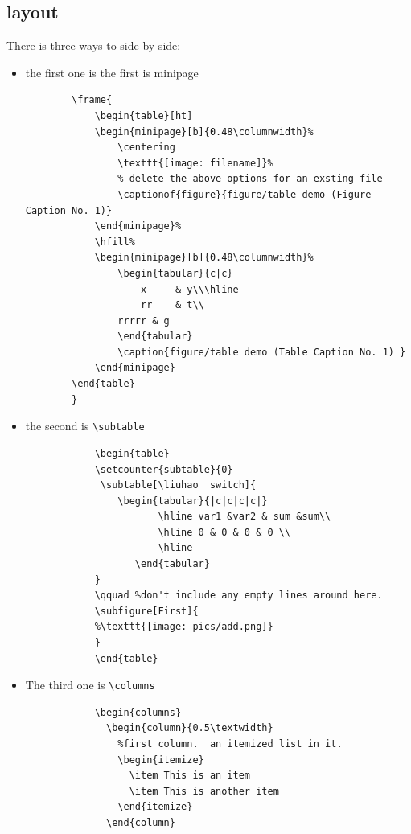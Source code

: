 \documentclass[a4paper,12pt,twoside]{book}
\begin{document}
	\subsection{layout}
	There is three ways to side by side:
	\begin{itemize}
	
	\item the first one is the first is minipage
		\begin{verbatim}
		\frame{
			\begin{table}[ht]
			\begin{minipage}[b]{0.48\columnwidth}%
		    	\centering
		    	\texttt{[image: filename]}%
		    	% delete the above options for an exsting file
		    	\captionof{figure}{figure/table demo (Figure Caption No. 1)}
			\end{minipage}%
			\hfill%
			\begin{minipage}[b]{0.48\columnwidth}%
				\begin{tabular}{c|c}
					x     & y\\\hline
					rr    & t\\
				rrrrr & g
				\end{tabular}
				\caption{figure/table demo (Table Caption No. 1) }
			\end{minipage}
		\end{table}
		}
		\end{verbatim}

	\item the second is \verb=\subtable=
		\begin{verbatim}
			\begin{table}
			\setcounter{subtable}{0}
			 \subtable[\liuhao  switch]{
			    \begin{tabular}{|c|c|c|c|}
			           \hline var1 &var2 & sum &sum\\
			           \hline 0 & 0 & 0 & 0 \\
			           \hline
			       \end{tabular}
			}
			\qquad %don't include any empty lines around here.
			\subfigure[First]{
			%\texttt{[image: pics/add.png]}
			}
			\end{table}
		\end{verbatim}

	\item The third one is  \verb=\columns=
		\begin{verbatim}
			\begin{columns}
			  \begin{column}{0.5\textwidth}
			    %first column.  an itemized list in it.
			    \begin{itemize}
			      \item This is an item
			      \item This is another item
			    \end{itemize}
			  \end{column}


\end{verbatim}
\end{itemize}
\end{document}

